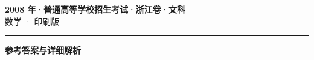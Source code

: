 \documentclass[zihao=5, a4paper]{ctexart}
\begin{document}
\begin{center}
  {\Large\bfseries 2008 年·普通高等学校招生考试·浙江卷·文科}\\[4pt]
  {\large 数学 · 印刷版}
\end{center}
\medskip
{}

\par\bigskip\hrule\bigskip
{}
\begin{center}{\large\bfseries 参考答案与详细解析}\end{center}
\smallskip

\end{document}
